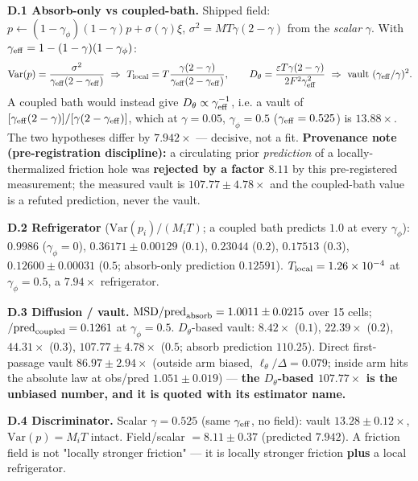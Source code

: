 \documentclass{article}
\begin{document}
\textbf{D.1 Absorb-only vs coupled-bath.} Shipped field: $p\leftarrow(1-\gamma_\phi)(1-\gamma)p+\sigma(\gamma)\xi$, $\sigma^2=MT\gamma(2-\gamma)$ from the \emph{scalar} $\gamma$. With $\gamma_{\rm eff}=1-(1-\gamma)(1-\gamma_\phi)$:
\begin{equation*}
\mathrm{Var}(p)=\frac{\sigma^2}{\gamma_{\rm eff}(2-\gamma_{\rm eff})}\ \Rightarrow\ T_{\rm local}=T\frac{\gamma(2-\gamma)}{\gamma_{\rm eff}(2-\gamma_{\rm eff})},\qquad D_\theta=\frac{\varepsilon T\gamma(2-\gamma)}{2F^2\gamma_{\rm eff}^2}\ \Rightarrow\ \text{vault }(\gamma_{\rm eff}/\gamma)^2.
\end{equation*}
A coupled bath would instead give $D_\theta\propto\gamma_{\rm eff}^{-1}$, i.e. a vault of $[\gamma_{\rm eff}(2-\gamma)]/[\gamma(2-\gamma_{\rm eff})]$, which at $\gamma=0.05$, $\gamma_\phi=0.5$ ($\gamma_{\rm eff}=0.525$) is $13.88\times$. The two hypotheses differ by $7.942\times$ --- decisive, not a fit. \textbf{Provenance note (pre-registration discipline):} a circulating prior \emph{prediction} of a locally-thermalized friction hole was \textbf{rejected by a factor $8.11$} by this pre-registered measurement; the measured vault is $107.77\pm4.78\times$ and the coupled-bath value is a refuted prediction, never the vault.

\textbf{D.2 Refrigerator} ($\mathrm{Var}(p_i)/(M_iT)$; a coupled bath predicts $1.0$ at every $\gamma_\phi$): $0.9986$ ($\gamma_\phi=0$), $0.36171\pm0.00129$ ($0.1$), $0.23044$ ($0.2$), $0.17513$ ($0.3$), $0.12600\pm0.00031$ ($0.5$; absorb-only prediction $0.12591$). $T_{\rm local}=1.26\times10^{-4}$ at $\gamma_\phi=0.5$, a $7.94\times$ refrigerator.

\textbf{D.3 Diffusion / vault.} $\mathrm{MSD}/\text{pred}_{\rm absorb}=1.0011\pm0.0215$ over 15 cells; $/\text{pred}_{\rm coupled}=0.1261$ at $\gamma_\phi=0.5$. $D_\theta$-based vault: $8.42\times$ ($0.1$), $22.39\times$ ($0.2$), $44.31\times$ ($0.3$), $\mathbf{107.77\pm4.78\times}$ ($0.5$; absorb prediction $110.25$). Direct first-passage vault $86.97\pm2.94\times$ (outside arm biased, $\ell_\theta/\Delta=0.079$; inside arm hits the absolute law at obs/pred $1.051\pm0.019$) --- \textbf{the $D_\theta$-based $107.77\times$ is the unbiased number, and it is quoted with its estimator name.}

\textbf{D.4 Discriminator.} Scalar $\gamma=0.525$ (same $\gamma_{\rm eff}$, no field): vault $13.28\pm0.12\times$, $\mathrm{Var}(p)=M_iT$ intact. Field/scalar $=8.11\pm0.37$ (predicted $7.942$). A friction field is not "locally stronger friction" --- it is locally stronger friction \textbf{plus} a local refrigerator.
\end{document}

